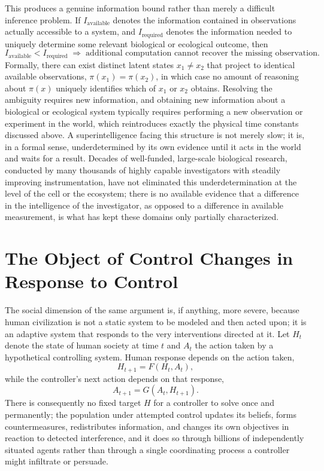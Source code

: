 \documentclass[11pt]{article}
\begin{document}
This produces a genuine information bound rather than merely a difficult inference problem. If $I_{\text{available}}$ denotes the information contained in observations actually accessible to a system, and $I_{\text{required}}$ denotes the information needed to uniquely determine some relevant biological or ecological outcome, then
\[
I_{\text{available}} < I_{\text{required}} \;\Longrightarrow\; \text{additional computation cannot recover the missing observation.}
\]
Formally, there can exist distinct latent states $x_1 \neq x_2$ that project to identical available observations, $\pi(x_1) = \pi(x_2)$, in which case no amount of reasoning about $\pi(x)$ uniquely identifies which of $x_1$ or $x_2$ obtains. Resolving the ambiguity requires new information, and obtaining new information about a biological or ecological system typically requires performing a new observation or experiment in the world, which reintroduces exactly the physical time constants discussed above. A superintelligence facing this structure is not merely slow; it is, in a formal sense, underdetermined by its own evidence until it acts in the world and waits for a result. Decades of well-funded, large-scale biological research, conducted by many thousands of highly capable investigators with steadily improving instrumentation, have not eliminated this underdetermination at the level of the cell or the ecosystem; there is no available evidence that a difference in the intelligence of the investigator, as opposed to a difference in available measurement, is what has kept these domains only partially characterized.

\section{The Object of Control Changes in Response to Control}

The social dimension of the same argument is, if anything, more severe, because human civilization is not a static system to be modeled and then acted upon; it is an adaptive system that responds to the very interventions directed at it. Let $H_t$ denote the state of human society at time $t$ and $A_t$ the action taken by a hypothetical controlling system. Human response depends on the action taken,
\[
H_{t+1} = F(H_t, A_t),
\]
while the controller's next action depends on that response,
\[
A_{t+1} = G(A_t, H_{t+1}).
\]
There is consequently no fixed target $H$ for a controller to solve once and permanently; the population under attempted control updates its beliefs, forms countermeasures, redistributes information, and changes its own objectives in reaction to detected interference, and it does so through billions of independently situated agents rather than through a single coordinating process a controller might infiltrate or persuade.
\end{document}
